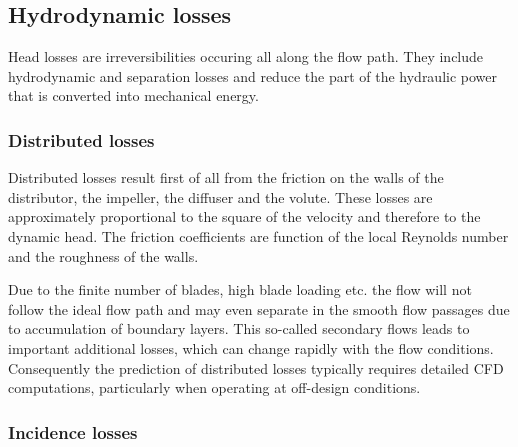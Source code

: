 \subsection{Hydrodynamic losses}
\label{subsec:pumps:hydrodynamicLosses}

Head losses are irreversibilities occuring all along the flow
path. They include hydrodynamic and separation losses and reduce the
part of the hydraulic power that is converted into mechanical energy.

\subsubsection{Distributed losses}

Distributed losses result first of all from the friction on the walls
of the distributor, the impeller, the diffuser and the volute. These
losses are approximately proportional to the square of the velocity
and therefore to the dynamic head. The friction coefficients are
function of the local Reynolds number and the roughness of the walls.

Due to the finite number of blades, high blade loading etc. the flow
will not follow the ideal flow path and may even separate in the
smooth flow passages due to accumulation of boundary layers. This
so-called secondary flows leads to important additional losses, which
can change rapidly with the flow conditions. Consequently the
prediction of distributed losses typically requires detailed CFD
computations, particularly when operating at off-design conditions.


\subsubsection{Incidence losses} 

